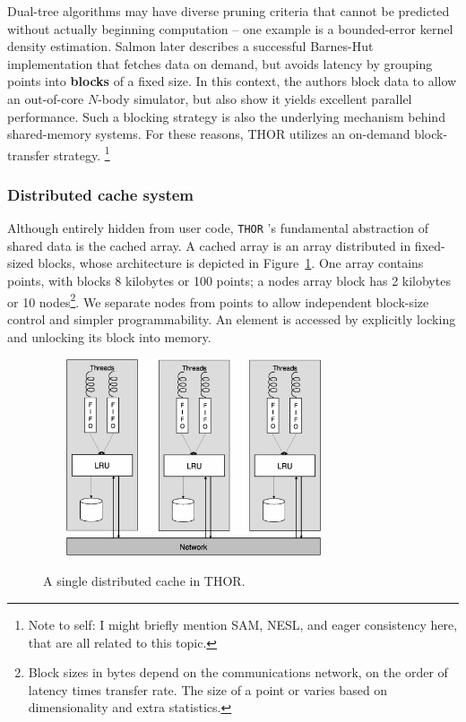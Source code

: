 \documentclass[twoside,leqno,twocolumn]{article}
\newcommand{\THOR}{{{\tt THOR}} }
\newcommand{\authornote}[1]{\footnote{Note to self: #1}}
\newcommand{\authorsnote}[1]{\authornote{#1}}
\newcommand{\fig}[1]{Figure~\ref{fig:#1}}
\newcommand{\mysubsub}[1]{\subsubsection{#1} }
\newcommand{\defterm}[1]{{\bf #1}}
\begin{document}
Dual-tree algorithms may have diverse pruning criteria that cannot be predicted without actually beginning computation -- one example is a bounded-error kernel density estimation\cite{gray_kde}.
Salmon later describes\cite{salmon97parallel} a successful Barnes-Hut implementation that fetches data on demand, but avoids latency by grouping points into \defterm{blocks} of a fixed size.
In this context, the authors block data to allow an out-of-core $N$-body simulator, but also show it yields excellent parallel performance.
Such a blocking strategy is also the underlying mechanism behind shared-memory systems.
For these reasons, THOR utilizes an on-demand block-transfer strategy.
\authorsnote{I might briefly mention SAM, NESL, and eager consistency here, that are all related to this topic.}

\mysubsub{Distributed cache system}
Although entirely hidden from user code, \THOR's fundamental abstraction of shared data is the cached array.
A cached array is an array distributed in fixed-sized blocks, whose architecture is depicted in \fig{cache}.
One array contains points, with blocks 8 kilobytes or 100 points; a nodes array block has 2 kilobytes or 10 nodes\footnote{Block sizes in bytes depend on the communications network, on the order of latency times transfer rate.  The size of a point or varies based on dimensionality and extra statistics.}.
We separate nodes from points to allow independent block-size control and simpler programmability.
An element is accessed by explicitly locking and unlocking its block into memory.

\begin{figure}
  \hspace{-.17in}
  \includegraphics[width=3.5in,height=2.3in]{DistributedArchitecture.eps}
  \vspace{-.3in}
  \
  \caption{\label{fig:cache} A single distributed cache in THOR.}
\end{figure}
\end{document}
